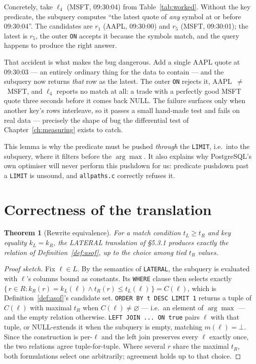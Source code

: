 \documentclass[11pt,a4paper]{report}
\theoremstyle{definition}
\theoremstyle{plain}
\newtheorem{theorem}[definition]{Theorem}
\newcommand{\code}[1]{\texttt{\small #1}}
\begin{document}
Concretely, take $\ell_4$ (MSFT, 09:30:04) from Table~\ref{tab:worked}. Without the key
predicate, the subquery computes ``the latest quote of \emph{any} symbol at or before
09:30:04''. The candidates are $r_1$ (AAPL, 09:30:00) and $r_5$ (MSFT, 09:30:01); the latest
is $r_5$, the outer \code{ON} accepts it because the symbols match, and the query happens to
produce the right answer.

That accident is what makes the bug dangerous. Add a single AAPL quote at 09:30:03 --- an
entirely ordinary thing for the data to contain --- and the subquery now returns \emph{that}
row as the latest. The outer \code{ON} rejects it, AAPL~$\neq$~MSFT, and $\ell_4$ reports no
match at all: a trade with a perfectly good MSFT quote three seconds before it comes back
NULL. The failure surfaces only when another key's rows interleave, so it passes a small
hand-made test and fails on real data --- precisely the shape of bug the differential test of
Chapter~\ref{ch:measuring} exists to catch.

This lemma is why the predicate must be pushed \emph{through} the \code{LIMIT}, i.e.\ into
the subquery, where it filters before the $\arg\max$. It also explains why PostgreSQL's own
optimiser will never perform this pushdown for us: predicate pushdown past a \code{LIMIT}
is unsound, and \code{allpaths.c} correctly refuses it.

\section{Correctness of the translation}

\begin{theorem}[Rewrite equivalence]\label{thm:rewrite}
For a match condition $t_L \ge t_R$ and key equality $k_L = k_R$, the LATERAL translation
of \S5.3.1 produces exactly the relation of Definition~\ref{def:asof}, up to the choice
among tied $t_R$ values.
\end{theorem}

\begin{proof}[Proof sketch]
Fix $\ell \in L$. By the semantics of \code{LATERAL}, the subquery is evaluated with
$\ell$'s columns bound as constants. Its \code{WHERE} clause then selects exactly
$\{\, r \in R : k_R(r) = k_L(\ell) \wedge t_R(r) \le t_L(\ell) \,\} = C(\ell)$, which is
Definition~\ref{def:asof}'s candidate set. \code{ORDER BY t DESC LIMIT 1} returns a tuple
of $C(\ell)$ with maximal $t_R$ when $C(\ell) \ne \varnothing$ --- i.e.\ an element of
$\arg\max$ --- and the empty relation otherwise. \code{LEFT JOIN ... ON true} pairs $\ell$
with that tuple, or NULL-extends it when the subquery is empty, matching $m(\ell) = \bot$.
Since the construction is per-$\ell$ and the left join preserves every $\ell$ exactly once,
the two relations agree tuple-for-tuple. Where several $r$ share the maximal $t_R$, both
formulations select one arbitrarily; agreement holds up to that choice.
\end{proof}
\end{document}
